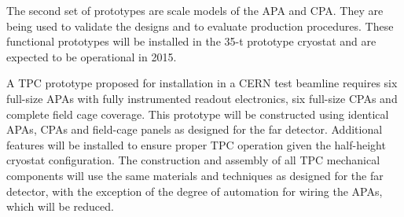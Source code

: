 The second set of prototypes are scale models of the APA and CPA. They
are being used to validate the designs and to evaluate production
procedures. These functional prototypes will be installed in the 35-t
prototype cryostat  %
and are expected to be operational in 2015.

A TPC prototype proposed for installation %
in a CERN test beamline
requires six full-size APAs with fully instrumented readout electronics,
six full-size CPAs and complete field cage coverage. This prototype will be %
constructed using identical APAs, CPAs and field-cage panels as
designed for the far detector. Additional features will be installed
to ensure proper TPC operation given the half-height cryostat
configuration. The construction and assembly of all TPC mechanical
components will use the same materials and techniques as designed for
the far detector, with the exception of the degree of automation for wiring
the APAs, which will be reduced.

